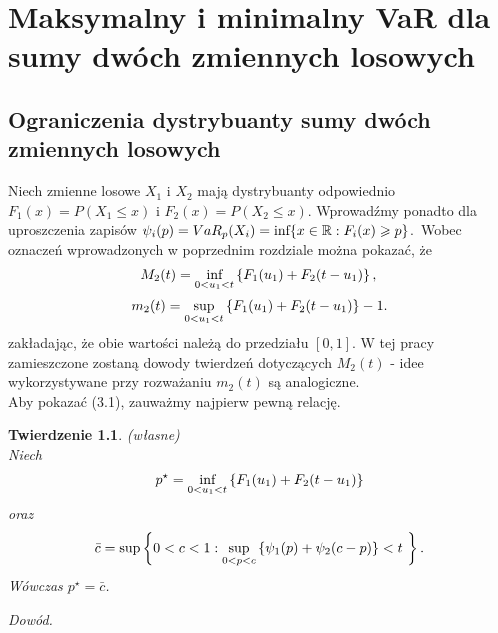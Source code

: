 \documentclass[12pt,a4paper,openany]{book}
\newtheorem{tw}{Twierdzenie}
\begin{document}
\chapter{Maksymalny i minimalny VaR dla sumy dwóch zmiennych losowych}
\section{Ograniczenia dystrybuanty sumy dwóch zmiennych losowych}

Niech zmienne losowe $X_{1}$ i $X_{2}$ mają dystrybuanty odpowiednio $F_{1}(x) = P(X_{1}\leqslant x)$ i $F_{2}(x) = P(X_{2} \leqslant x)$. Wprowadźmy ponadto dla uproszczenia zapisów $\psi_{i}(p) = VaR_{p}(X_{i}) =  \textnormal{inf} \{x \in \mathbb{R}: F_{i}(x)\geqslant p \}$.\
Wobec oznaczeń wprowadzonych w poprzednim rozdziale można pokazać, że
\begin{equation}
M_{2}(t) = \underset{0 < u_{1} < t}{\textnormal{inf}} \left\lbrace F_{1}(u_{1}) + F_{2}(t -u_{1}) \right\rbrace,\\
\end{equation}
\begin{equation}
m_{2}(t) = \underset{0 < u_{1} < t}{\textnormal{sup}} \left\lbrace F_{1}(u_{1}) + F_{2}(t -u_{1}) \right\rbrace -1.
\end{equation}
zakładając, że obie wartości należą do przedziału $[0,1]$. W tej pracy zamieszczone zostaną dowody twierdzeń dotyczących $M_{2}(t)$ - idee wykorzystywane przy rozważaniu $m_{2}(t)$ są analogiczne.\\
Aby pokazać (3.1), zauważmy najpierw pewną relację.

\begin{tw}\textnormal{(własne)}\*\\
Niech 
\begin{equation}
p^{\star} =  \underset{0 < u_{1} < t}{\textnormal{inf}} \left\lbrace F_{1}(u_{1}) + F_{2}(t -u_{1}) \right\rbrace
\end{equation}
oraz 
\begin{equation}
\bar c = \textnormal{sup} \left\lbrace 0<c<1: \underset{0<p<c}{\textnormal{sup}} \left\lbrace \psi_{1}(p) + \psi_{2}(c-p) \right\rbrace <t\ \right\rbrace.
\end{equation}
Wówczas $p^{\star} = \bar c$.
\end{tw}

\noindent \textit{Dowód.}
\end{document}
